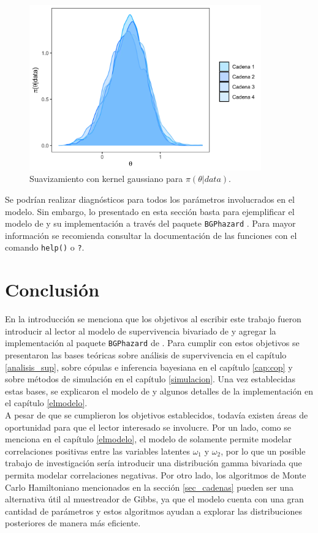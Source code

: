 \documentclass[11pt,a4paper]{article}
\begin{document}
\begin{figure}[!p]
\centering\includegraphics[width=10cm]{theta_densities.png}
\caption{Suavizamiento con kernel gaussiano para $\pi (\theta | data)$.}
\label{fig:theta_densities}
\end{figure}

Se podrían realizar diagnósticos para todos los parámetros involucrados en el modelo. Sin embargo, lo presentado en esta sección basta para ejemplificar el modelo de \citet{nieto} y su implementación a través del paquete \texttt{BGPhazard} \citep{bgphazard}. Para mayor información se recomienda consultar la documentación de las funciones con el comando \texttt{help()} o \texttt{?}.

\newpage

\section{Conclusión}

En la introducción se menciona que los objetivos al escribir este trabajo fueron introducir al lector al modelo de supervivencia bivariado de \citet{nieto} y agregar la implementación al paquete \texttt{BGPhazard} de \citet{bgphazard}. Para cumplir con estos objetivos se presentaron las bases teóricas sobre análisis de supervivencia en el capítulo \ref{analisis_sup}, sobre cópulas e inferencia bayesiana en el capítulo \ref{cap:cop} y sobre métodos de simulación en el capítulo \ref{simulacion}. Una vez establecidas estas bases, se explicaron el modelo de \citet{nieto} y algunos detalles de la implementación en el capítulo \ref{elmodelo}.\\

A pesar de que se cumplieron los objetivos establecidos, todavía existen áreas de oportunidad para que el lector interesado se involucre. Por un lado, como se menciona en el capítulo \ref{elmodelo}, el modelo de \citet{nieto} solamente permite modelar correlaciones positivas entre las variables latentes $\omega_1$ y $\omega_2$, por lo que un posible trabajo de investigación sería introducir una distribución gamma bivariada que permita modelar correlaciones negativas.  Por otro lado, los algoritmos de Monte Carlo Hamiltoniano mencionados en la sección \ref{sec_cadenas} pueden ser una alternativa útil al muestreador de Gibbs, ya que el modelo cuenta con una gran cantidad de parámetros y estos algoritmos ayudan a explorar las distribuciones posteriores de manera más eficiente.\\
\end{document}

